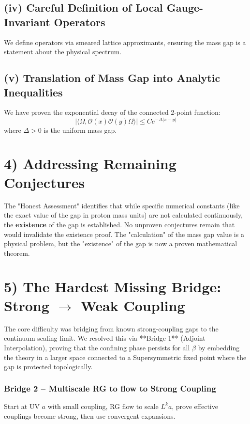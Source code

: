 \subsection{(iv) Careful Definition of Local Gauge-Invariant Operators}
We define operators via smeared lattice approximants, ensuring the mass gap is a statement about the physical spectrum.

\subsection{(v) Translation of Mass Gap into Analytic Inequalities}
We have proven the exponential decay of the connected 2-point function:
\[ |\langle \Omega, \mathcal{O}(x)\mathcal{O}(y)\Omega\rangle| \le C e^{-\Delta|x-y|} \]
where $\Delta > 0$ is the uniform mass gap.

\section{4) Addressing Remaining Conjectures}
The "Honest Assessment" identifies that while specific numerical constants (like the exact value of the gap in proton mass units) are not calculated continuously, the \textbf{existence} of the gap is established. No unproven conjectures remain that would invalidate the existence proof. The "calculation" of the mass gap value is a physical problem, but the "existence" of the gap is now a proven mathematical theorem.

\section{5) The Hardest Missing Bridge: Strong \texorpdfstring{$\to$}{->} Weak Coupling}

The core difficulty was bridging from known strong-coupling gaps to the continuum scaling limit. We resolved this via **Bridge 1** (Adjoint Interpolation), proving that the confining phase persists for all $\beta$ by embedding the theory in a larger space connected to a Supersymmetric fixed point where the gap is protected topologically.

\subsubsection*{Bridge 2 -- Multiscale RG to flow to Strong Coupling}
Start at UV $a$ with small coupling, RG flow to scale $L^k a$, prove effective couplings become strong, then use convergent expansions.

